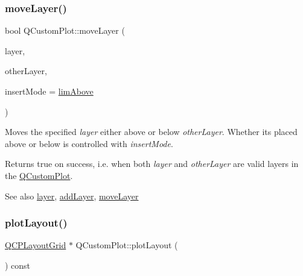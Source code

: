\subsubsection{\texorpdfstring{move\+Layer()}{moveLayer()}}
{\footnotesize\ttfamily bool Q\+Custom\+Plot\+::move\+Layer (\begin{DoxyParamCaption}\item[{\hyperlink{class_q_c_p_layer}{Q\+C\+P\+Layer} $\ast$}]{layer,  }\item[{\hyperlink{class_q_c_p_layer}{Q\+C\+P\+Layer} $\ast$}]{other\+Layer,  }\item[{\hyperlink{class_q_custom_plot_a75a8afbe6ef333b1f3d47abb25b9add7}{Q\+Custom\+Plot\+::\+Layer\+Insert\+Mode}}]{insert\+Mode = {\ttfamily \hyperlink{class_q_custom_plot_a75a8afbe6ef333b1f3d47abb25b9add7a56ffb40bbf81e9b5d869cffc88999a36}{lim\+Above}} }\end{DoxyParamCaption})}

Moves the specified {\itshape layer} either above or below {\itshape other\+Layer}. Whether it\textquotesingle{}s placed above or below is controlled with {\itshape insert\+Mode}.

Returns true on success, i.\+e. when both {\itshape layer} and {\itshape other\+Layer} are valid layers in the \hyperlink{class_q_custom_plot}{Q\+Custom\+Plot}.

\begin{DoxySeeAlso}{See also}
\hyperlink{class_q_custom_plot_a0a96244e7773b242ef23c32b7bdfb159}{layer}, \hyperlink{class_q_custom_plot_ad5255393df078448bb6ac83fa5db5f52}{add\+Layer}, \hyperlink{class_q_custom_plot_ae896140beff19424e9e9e02d6e331104}{move\+Layer} 
\end{DoxySeeAlso}
\mbox{\label{class_q_custom_plot_af1a1f1f571237deb7c2bd34a5e9f018f}} 
\subsubsection{\texorpdfstring{plot\+Layout()}{plotLayout()}}
{\footnotesize\ttfamily \hyperlink{class_q_c_p_layout_grid}{Q\+C\+P\+Layout\+Grid} $\ast$ Q\+Custom\+Plot\+::plot\+Layout (\begin{DoxyParamCaption}{ }\end{DoxyParamCaption}) const\hspace{0.3cm}{\ttfamily [inline]}}

